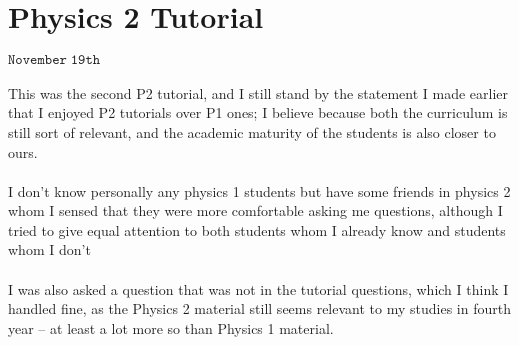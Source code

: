 \section{Physics 2 Tutorial}
\begin{flushright}
$\mathtt{November \; 19th}$
\end{flushright}
\paragraph{}

This was the second P2 tutorial, and I still stand by the statement I made earlier that I enjoyed P2 tutorials over P1 ones; I believe because both the curriculum is still sort of relevant, and the academic maturity of the students is also closer to ours. 
\paragraph{}

I don't know personally any physics 1 students but have some friends in physics 2 whom I sensed that they were more comfortable asking me questions, although I tried to give equal attention to both students whom I already know and students whom I don't
\paragraph{}

 I was also asked a question that was not in the tutorial questions, which I think I handled fine, as the Physics 2 material still seems relevant to my studies in fourth year -- at least a lot more so than Physics 1 material. 